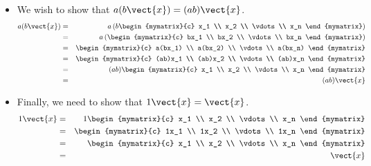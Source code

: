\begin{solution}
\begin{itemize}
\item
We wish to show that $a(b\vect{x}) = (ab) \vect{x}$. 
\begin{eqnarray*}
a(b\vect{x}) &=& 
a\left(b \begin{mymatrix}{c}
x_1 \\
x_2 \\
\vdots \\
x_n
\end{mymatrix} \right) \\
&=& a\left(
\begin{mymatrix}{c}
bx_1 \\
bx_2 \\
\vdots \\
bx_n
\end{mymatrix} \right) \\
&=&
\begin{mymatrix}{c}
a(bx_1) \\
a(bx_2) \\
\vdots \\
a(bx_n)
\end{mymatrix} \\
&=&
\begin{mymatrix}{c}
(ab)x_1 \\
(ab)x_2 \\
\vdots \\
(ab)x_n
\end{mymatrix} \\
&=& (ab)
\begin{mymatrix}{c}
x_1 \\
x_2 \\
\vdots \\
x_n
\end{mymatrix} \\
&=& (ab)\vect{x}
\end{eqnarray*}

\item
Finally, we need to show that $1\vect{x} = \vect{x}$.
\begin{eqnarray*}
1\vect{x} &=& 1 \begin{mymatrix}{c}
x_1 \\
x_2 \\
\vdots \\
x_n
\end{mymatrix} \\
&=&
\begin{mymatrix}{c}
1x_1 \\
1x_2 \\
\vdots \\
1x_n
\end{mymatrix} \\
&=& 
\begin{mymatrix}{c}
x_1 \\
x_2 \\
\vdots \\
x_n
\end{mymatrix} \\
&=& \vect{x}
\end{eqnarray*}
\end{itemize}


\end{solution}
